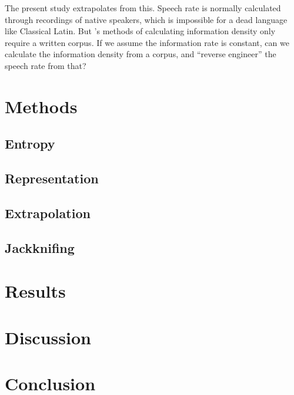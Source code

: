 \documentclass[12pt,twoside]{article}
\begin{document}
The present study extrapolates from this. Speech rate is normally calculated through recordings of native speakers, which is impossible for a dead language like Classical Latin. But \citet{oh}'s methods of calculating information density only require a written corpus. If we assume the information rate is constant, can we calculate the information density from a corpus, and ``reverse engineer'' the speech rate from that?



\section{Methods}
\label{sec:meth}

\subsection{Entropy}

\subsection{Representation}


\subsection{Extrapolation}

\subsection{Jackknifing}

\section{Results}
\label{sec:res}

\section{Discussion}
\label{sec:disc}

\section{Conclusion}
\label{sec:concl}

\label{sec:refs}
\setlength{} %
\printbibliography
\end{document}
